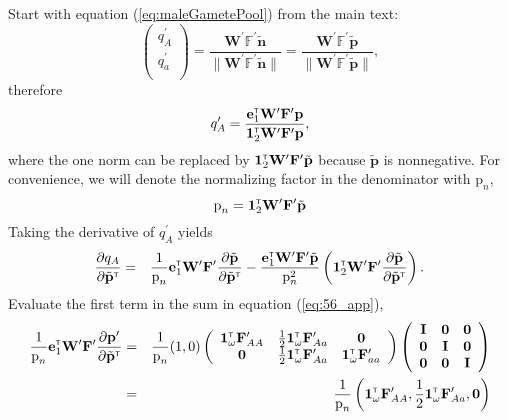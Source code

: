 \documentclass[11pt]{article}
\def\mbf#1{\mathbf{#1}}
\def\mbb#1{\mathbb{#1}}
\newcommand{\bo}[1]{{\bf #1}}
\newcommand{\tr}{{\mbox{\tiny \sf T}}}
\begin{document}
 Start with equation (\ref{eq:maleGametePool}) from the main text:
\begin{equation} \label{eq:maleGametePool_app}
	\left(
		\begin{array}{c}
			q^{\prime}_{A} \\
			q^{\prime}_{a} \\
		\end{array} \right) = 
			\frac{\mbf{W}^{\prime} \mbb{F}^{\prime} \tilde{\mbf{n}}}{\| \mbf{W}^{\prime} \mbb{F}^{\prime} \tilde{\mbf{n}} \|} = 
				\frac{\mbf{W}^{\prime} \mbb{F}^{\prime} \tilde{\mbf{p}}}{\| \mbf{W}^{\prime} \mbb{F}^{\prime} \tilde{\mbf{p}}\|},
\end{equation}
therefore
\begin{equation}
  q^\prime_A=\frac{\mathbf{e}_1^\tr \mathbf{W}^\prime \mathbf{F}^\prime  \mathbf{p}}{\mathbf{1}^\tr_{2}\mathbf{W}^\prime\mathbf{F}^\prime\mathbf{p}}, \label{eq:male_gamete_pool}
\end{equation}
 where the one norm can be replaced by $\mathbf{1}^\tr_{2}\mathbf{W}^\prime\mathbf{F}^\prime \tilde{\mbf{p}}$ because $\tilde{\mbf{p}}$ is nonnegative. For convenience, we will denote the normalizing factor in the denominator with $ \mbox{p}_{n}$, 
 \begin{equation}
   \mbox{p}_{n}=\mathbf{1}^\tr_{2}\mathbf{W}^\prime\mathbf{F}^\prime \tilde{\mbf{p}}
 \end{equation}
 Taking the derivative of $ q^\prime_A$ yields
\begin{eqnarray}
  \frac{\partial   q_A }{\partial \tilde{\bo p}^\tr}&=& \frac{1}{ \mbox{p}_{n}}\mathbf{e}_1^\tr \mathbf{W}^\prime \mathbf{F}^\prime   \frac{\partial  \tilde{\mbf{p}}}{\partial \tilde{\bo p}^\tr} - \frac{\mathbf{e}_1^\tr \mathbf{W}^\prime \mathbf{F}^\prime \tilde{\mbf{p}}}{ \mbox{p}_{n}^2} \left( \mathbf{1}^\tr_{2}\mathbf{W}^\prime\mathbf{F}^\prime \frac{\partial  \tilde{\mbf{p}}}{\partial \tilde{\bo p}^\tr} \right). \label{eq:56_app}
\end{eqnarray}
Evaluate the first term in the sum in equation (\ref{eq:56_app}),
\begin{eqnarray}
	 \frac{1}{ \mbox{p}_{n}}\mathbf{e}_1^\tr \mathbf{W}^\prime \mathbf{F}^\prime   \frac{\partial  \mathbf{p}^\prime}{\partial \tilde{\bo p}^\tr} &=&  \frac{1}{ \mbox{p}_{n}} (1,0) \left(\begin{array} {ccc}
\mathbf{1}^\tr_{\omega} \mathbf{F}_{AA}^\prime& \frac{1}{2}\mathbf{1}^\tr_{\omega} \mathbf{F}_{Aa}^\prime &\mathbf{0} \\
\mathbf{0} &\frac{1}{2}\mathbf{1}^\tr_{\omega} \mathbf{F}_{Aa}^\prime & \mathbf{1}^\tr_{\omega} \mathbf{F}_{aa}^\prime
\end{array}\right) \left(\begin{array} {ccc}
\mathbf{I}&\mathbf{0}  &\mathbf{0} \\
\mathbf{0} &\mathbf{I}& \mathbf{0}  \\
\mathbf{0} &\mathbf{0}  &  \mathbf{I}
\end{array}\right) \nonumber \\
&=& \frac{1}{ \mbox{p}_{n}} \left( \mathbf{1}^\tr_{\omega} \mathbf{F}_{AA}^\prime,  \frac{1}{2}\mathbf{1}^\tr_{\omega} \mathbf{F}_{Aa}^\prime,  \mathbf{0} \right)\label{eq:first_term_app_reviewer}
\end{eqnarray}
\end{document}

